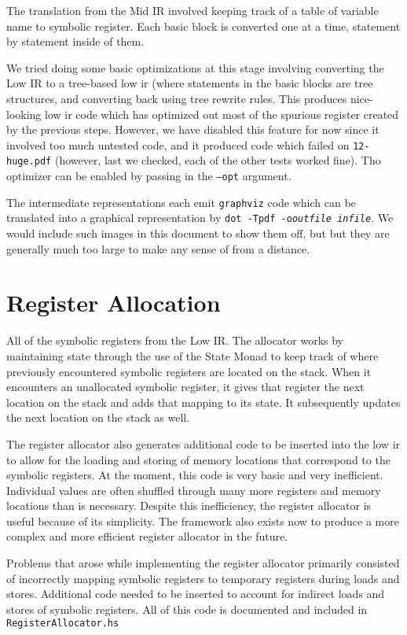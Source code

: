 \documentclass[11pt]{article}
\begin{document}
The translation from the Mid IR involved keeping track of a table of
variable name to symbolic register.  Each basic block is converted one
at a time, statement by statement inside of them.

We tried doing some basic optimizations at this stage involving
converting the Low IR to a tree-based low ir (where statements in the
basic blocks are tree structures, and converting back using tree
rewrite rules.  This produces nice-looking low ir code which has
optimized out most of the spurious register created by the previous
steps.  However, we have disabled this feature for now since it
involved too much untested code, and it produced code which failed on
\texttt{12-huge.pdf} (however, last we checked, each of the other
tests worked fine).  Tho optimizer can be enabled by passing in the
\texttt{--opt} argument.

The intermediate representations each emit \texttt{graphviz} code
which can be translated into a graphical representation by \texttt{dot
  -Tpdf -o\textit{outfile} \textit{infile}}.  We would include such
images in this document to show them off, but but they are generally
much too large to make any sense of from a distance.

\section {Register Allocation} 
\label{sec:regalloc}

All of the symbolic registers from the Low IR. The allocator works by
maintaining state through the use of the State Monad to keep track of
where previously encountered symbolic registers are located on the
stack. When it encounters an unallocated symbolic register, it gives
that register the next location on the stack and adds that mapping to
its state. It subsequently updates the next location on the stack as
well.

The register allocator also generates additional code to be inserted
into the low ir to allow for the loading and storing of memory
locations that correspond to the symbolic registers. At the moment,
this code is very basic and very inefficient. Individual values are
often shuffled through many more registers and memory locations than is
necessary. Despite this inefficiency, the register allocator is useful
because of its simplicity. The framework also exists now to produce a
more complex and more efficient register allocator in the future. 

Problems that arose while implementing the register allocator
primarily consisted of incorrectly mapping symbolic registers to
temporary registers during loads and stores. Additional code needed to
be inserted to account for indirect loads and stores of symbolic
registers. All of this code is documented and included in
\texttt{RegisterAllocator.hs}
\end{document}
